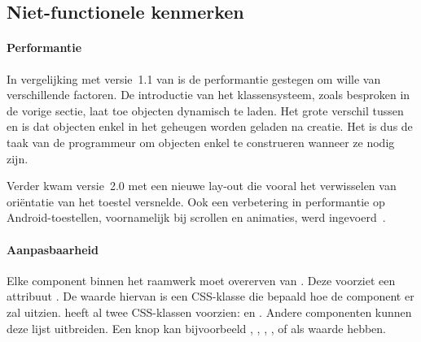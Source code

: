 
\subsection{Niet-functionele kenmerken}
\paragraph{Performantie}
In vergelijking met versie~1.1 van \st{} is de performantie gestegen om wille van verschillende factoren.  
De introductie van het klassensysteem,  zoals besproken in de vorige sectie,  laat toe objecten dynamisch te laden. 
Het grote verschil tussen  en  is dat objecten enkel in het geheugen worden geladen na creatie.  
Het is dus de taak van de programmeur om objecten enkel te construeren wanneer ze nodig zijn.

Verder kwam versie~2.0 met een nieuwe lay-out  die vooral het verwisselen van oriëntatie van het toestel versnelde.  
Ook een verbetering in performantie op Android-toestellen,  voornamelijk bij scrollen en animaties,  werd ingevoerd~\cite{Inc.}.



\paragraph{Aanpasbaarheid}
\label{sec:sencha-aanpasbaarheid}
Elke component binnen het raamwerk moet overerven van .  
Deze voorziet een attribuut .  
De waarde hiervan is een CSS-klasse die bepaald hoe de component er zal uitzien.  
\st{} heeft al twee CSS-klassen voorzien:   en .  
Andere componenten kunnen deze lijst uitbreiden.  
Een knop kan bijvoorbeeld ,  ,  ,  ,   of  als  waarde hebben.

